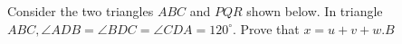 Consider the two triangles $ ABC$ and $ PQR$ shown below. In triangle $ ABC, \angle ADB = \angle BDC = \angle CDA = 120^\circ$. Prove that $ x=u+v+w$.$B$